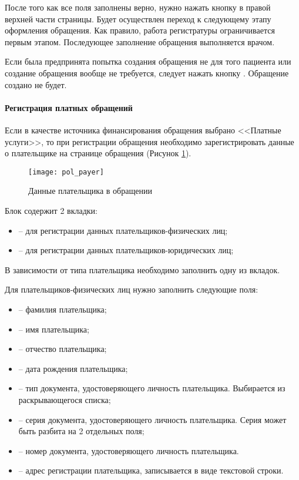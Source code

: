 {После того как все поля заполнены верно, нужно нажать кнопку  в правой верхней части страницы. Будет осуществлен переход к следующему этапу оформления обращения. Как правило, работа регистратуры ограничивается первым этапом. Последующее заполнение обращения выполняется врачом.

Если была предпринята попытка создания обращения не для того пациента или создание обращения вообще не требуется, следует нажать кнопку . Обращение создано не будет.

\paragraph{Регистрация платных обращений} \label{pol_payer}

Если в качестве источника финансирования обращения выбрано <<Платные услуги>>, то при регистрации обращения необходимо зарегистрировать данные о плательщике на странице обращения (Рисунок \ref{img_pol_payer}). 

\begin{figure}[ht]\centering
	\texttt{[image: pol\_payer]}
	\caption{Данные плательщика в обращении}
	\label{img_pol_payer}
\end{figure}

Блок содержит 2 вкладки:

\begin{itemize}
 \item {} -- для регистрации данных плательщиков-физических лиц;
 \item {} -- для регистрации данных плательщиков-юридических лиц;
\end{itemize}

В зависимости от типа плательщика необходимо заполнить одну из вкладок.

Для плательщиков-физических лиц нужно заполнить следующие поля:
\begin{itemize}
	\item {} -- фамилия плательщика;
	\item {} -- имя плательщика;
	\item {} -- отчество плательщика;
	\item {} -- дата рождения плательщика;
	\item {} -- тип документа, удостоверяющего личность плательщика. Выбирается из раскрывающегося списка;
	\item {} -- серия документа, удостоверяющего личность плательщика. Серия может быть разбита на 2 отдельных поля;
	\item {} -- номер документа, удостоверяющего личность плательщика. 
	\item {} -- адрес регистрации плательщика, записывается в виде текстовой строки. 
\end{itemize}

}
